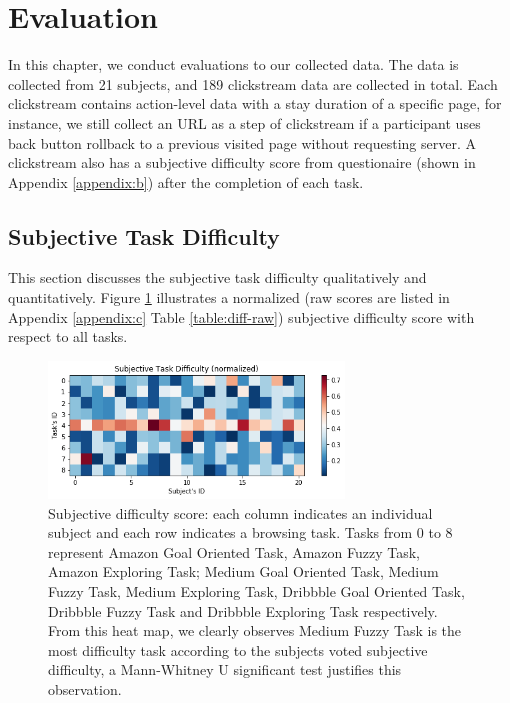 \section{Evaluation}
\label{ch:eval}

In this chapter, we conduct evaluations to our collected data.
The data is collected from 21 subjects, and 189 clickstream data are collected in total. 
Each clickstream contains action-level data with a stay duration
of a specific page, for instance, we still collect an URL as a step of clickstream 
if a participant uses back button rollback to a previous visited page without requesting server. 
A clickstream also has a subjective difficulty score from questionaire (shown in Appendix \ref{appendix:b}) 
after the completion of each task.

\subsection{Subjective Task Difficulty}

This section discusses the subjective task difficulty qualitatively and quantitatively.
Figure \ref{fig:difficulty} illustrates a normalized (raw scores are listed in 
Appendix \ref{appendix:c} Table \ref{table:diff-raw}) subjective difficulty score 
with respect to all tasks.

\begin{figure}[H]
    \centering
    \includegraphics[width=0.7\textwidth]{figures/difficulty}
    \caption{Subjective difficulty score: each column indicates an individual subject and
    each row indicates a browsing task. Tasks from 0 to 8 represent Amazon Goal Oriented Task,
    Amazon Fuzzy Task, Amazon Exploring Task; Medium Goal Oriented Task, Medium Fuzzy Task,
    Medium Exploring Task, Dribbble Goal Oriented Task, Dribbble Fuzzy Task and Dribbble Exploring Task
    respectively.
    From this heat map, we clearly observes Medium Fuzzy Task is the most difficulty task
    according to the subjects voted subjective difficulty, a Mann-Whitney U significant 
    test justifies this observation.}
    \label{fig:difficulty}
\end{figure}

